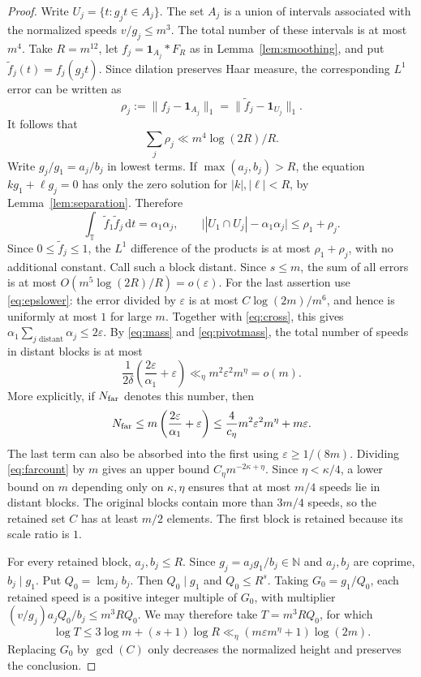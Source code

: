 \documentclass[12pt,leqno]{article}
\numberwithin{equation}{section}
\theoremstyle{remark}
\newcommand{\LRtorus}{\mathbb T}
\newcommand{\LRnatural}{\mathbb N}
\newcommand{\LRindicator}{\mathbf 1}
\newcommand{\LRdifferential}{\,\mathrm d}
\DeclareMathOperator{\LRlcm}{lcm}
\begin{document}
\begin{proof}
Write $U_j=\{t:g_jt\in A_j\}$. The set $A_j$ is a union of intervals associated with the normalized speeds $v/g_j\le m^3$. The total number of these intervals is at most $m^4$. Take $R=m^{12}$, let $f_j=\LRindicator_{A_j}*F_R$ as in Lemma~\ref{lem:smoothing}, and put $\widetilde f_j(t)=f_j(g_jt)$. Since dilation preserves Haar measure, the corresponding $L^1$ error can be written as
\[
\rho_j:=\|f_j-\LRindicator_{A_j}\|_1
=\|\widetilde f_j-\LRindicator_{U_j}\|_1.
\]
It follows that
\[
\sum_j\rho_j\ll m^4\log(2R)/R.
\]
Write $g_j/g_1=a_j/b_j$ in lowest terms. If $\max(a_j,b_j)>R$, the equation $kg_1+\ell g_j=0$ has only the zero solution for $|k|,|\ell|<R$, by Lemma~\ref{lem:separation}. Therefore
\[
\int_\LRtorus\widetilde f_1\widetilde f_j\LRdifferential t=\alpha_1\alpha_j,
\qquad \bigl||U_1\cap U_j|-\alpha_1\alpha_j\bigr|\le\rho_1+\rho_j.
\]
Since $0\le\widetilde f_j\le1$, the $L^1$ difference of the products is at most $\rho_1+\rho_j$, with no additional constant. Call such a block distant. Since $s\le m$, the sum of all errors is at most
$O(m^5\log(2R)/R)=o(\varepsilon)$. For the last assertion use \eqref{eq:epslower}: the error divided by $\varepsilon$ is at most $C\log(2m)/m^6$, and hence is uniformly at most $1$ for large $m$. Together with \eqref{eq:cross}, this gives $\alpha_1\sum_{j\text{ distant}}\alpha_j\le2\varepsilon$. By \eqref{eq:mass} and \eqref{eq:pivotmass}, the total number of speeds in distant blocks is at most
\begin{equation}\label{eq:farcount}
\frac1{2\delta}\left(\frac{2\varepsilon}{\alpha_1}+\varepsilon\right)
\ll_\eta m^2\varepsilon^2m^\eta=o(m).
\end{equation}
More explicitly, if $N_{\rm far}$ denotes this number, then
\[
N_{\rm far}\le m\left(\frac{2\varepsilon}{\alpha_1}+\varepsilon\right)
\le\frac4{c_\eta}m^2\varepsilon^2m^\eta+m\varepsilon.
\]
The last term can also be absorbed into the first using $\varepsilon\ge1/(8m)$. Dividing \eqref{eq:farcount} by $m$ gives an upper bound $C_\eta m^{-2\kappa+\eta}$. Since $\eta<\kappa/4$, a lower bound on $m$ depending only on $\kappa,\eta$ ensures that at most $m/4$ speeds lie in distant blocks. The original blocks contain more than $3m/4$ speeds, so the retained set $C$ has at least $m/2$ elements. The first block is retained because its scale ratio is $1$.

For every retained block, $a_j,b_j\le R$. Since $g_j=a_jg_1/b_j\in\LRnatural$ and $a_j,b_j$ are coprime, $b_j\mid g_1$. Put $Q_0=\LRlcm_j b_j$. Then $Q_0\mid g_1$ and $Q_0\le R^s$. Taking $G_0=g_1/Q_0$, each retained speed is a positive integer multiple of $G_0$, with multiplier $(v/g_j)a_jQ_0/b_j\le m^3RQ_0$. We may therefore take $T=m^3RQ_0$, for which
\[
\log T\le3\log m+(s+1)\log R
\ll_\eta(m\varepsilon m^\eta+1)\log(2m).
\]
Replacing $G_0$ by $\gcd(C)$ only decreases the normalized height and preserves the conclusion.
\end{proof}
\end{document}
